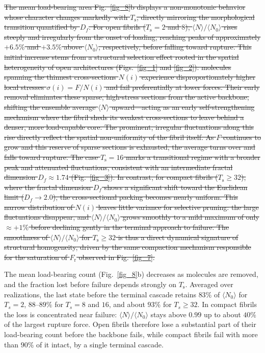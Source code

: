 \documentclass[aps,physrev,preprint,groupedaddress,linenumbers]{revtex4-2}
\newcommand{\added}[1]{{\color{red}#1}}
\newcommand{\deleted}[1]{{\color{red}\sout{#1}}}
\begin{document}
\deleted{The mean load-bearing area Fig.~\ref{fig_8}b displays a non-monotonic behavior whose character changes markedly with $T_{\mathrm{s}}$, directly mirroring the morphological transition quantified by $D_f$. For open fibrils ($T_{\mathrm{s}} = 2$ and $8$), $\langle N \rangle / \langle N_0 \rangle$ rises steeply and irregularly from the onset of loading, reaching peaks of approximately $+6.5\%$ and $+3.5\%$ above $\langle N_0 \rangle$, respectively, before falling toward rupture. This initial increase stems from a structural selection effect rooted in the spatial heterogeneity of open architectures (Figs.~\ref{fig_1} and \ref{fig_2}): molecules spanning the thinnest cross-sections $N(i)$ experience disproportionately higher local stresses $\sigma(i) = F/N(i)$ and fail preferentially at lower forces. Their early removal eliminates these sparse, high-stress sections from the active backbone, shifting the ensemble average $\langle N \rangle$ upward—acting as an early self-strengthening mechanism where the fibril sheds its weakest cross-sections to leave behind a denser, more load-capable core. The prominent, irregular fluctuations along this rise directly reflect the spatial non-uniformity of the fibril itself. As $F$ continues to grow and this reserve of sparse sections is exhausted, the average turns over and falls toward rupture. The case $T_{\mathrm{s}} = 16$ marks a transitional regime with a broader peak and attenuated fluctuations, consistent with an intermediate fractal dimension $D_f \approx 1.74$ (Fig.~\ref{fig_3}). In contrast, for compact fibrils ($T_{\mathrm{s}} \ge 32$), where the fractal dimension $D_f$ shows a significant shift toward the Euclidean limit ($D_f \to 2.0$), the cross-sectional packing becomes nearly uniform. This narrow distribution of $N(i)$ leaves little variance for selective pruning: the large fluctuations disappear, and $\langle N \rangle / \langle N_0 \rangle$ grows smoothly to a mild maximum of only $\approx +1\%$ before declining gently in the terminal approach to failure. The smoothness of $\langle N \rangle / \langle N_0 \rangle$ for $T_{\mathrm{s}} \geq 32$ is thus a direct dynamical signature of structural homogeneity, driven by the same compaction mechanism responsible for the saturation of $F_{\mathrm{r}}$ observed in Fig.~\ref{fig_7}.}

\added{The mean load-bearing count (Fig.~\ref{fig_8}b) decreases as molecules are removed, and the fraction lost before failure depends strongly on $T_{\mathrm{s}}$. Averaged over realizations, the last state before the terminal cascade retains $83\%$ of $\langle N_0 \rangle$ for $T_s = 2$, $88$--$89\%$ for $T_s = 8$ and $16$, and about $93\%$ for $T_s \geq 32$. In compact fibrils the loss is concentrated near failure: $\langle N \rangle / \langle N_0 \rangle$ stays above $0.99$ up to about $40\%$ of the largest rupture force. Open fibrils therefore lose a substantial part of their load-bearing count before the backbone fails, while compact fibrils fail with more than $90\%$ of it intact, by a single terminal cascade.}  
\end{document}
